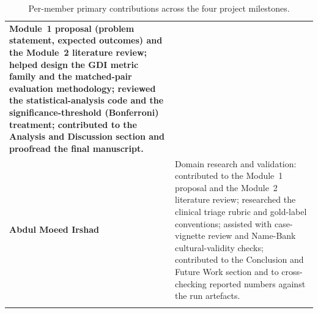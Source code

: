 \documentclass[11pt,a4paper]{article}
\begin{document}
{\begin{longtable}{@{}>{\bfseries}p{3.2cm} p{\dimexpr\linewidth-3.2cm-4\tabcolsep}@{}}
Module~1 proposal (problem statement, expected outcomes) and the Module~2
literature review; helped design the GDI metric family and the matched-pair
evaluation methodology; reviewed the statistical-analysis code and the
significance-threshold (Bonferroni) treatment; contributed to the Analysis and
Discussion section and proofread the final manuscript.\\
\rowcolor{rowalt}
Abdul Moeed Irshad & Domain research and validation: contributed to the
Module~1 proposal and the Module~2 literature review; researched the clinical
triage rubric and gold-label conventions; assisted with case-vignette review
and Name-Bank cultural-validity checks; contributed to the Conclusion and
Future Work section and to cross-checking reported numbers against the run
artefacts.\\
\caption{Per-member primary contributions across the four project milestones.}\\
\end{longtable}}
\end{document}
